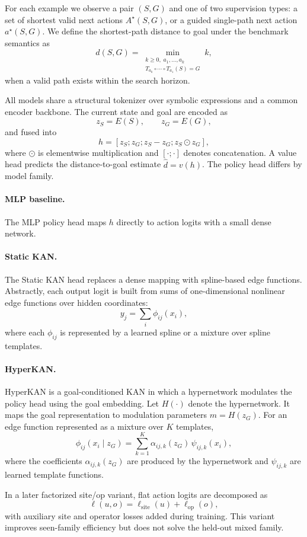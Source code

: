\documentclass[11pt]{article}
\newcommand{\kan}{KAN}
\newcommand{\hyperkan}{HyperKAN}
\newcommand{\staticKAN}{Static KAN}
\newcommand{\mlp}{MLP}
\begin{document}
For each example we observe a pair $(S,G)$ and one of two supervision types: a set of shortest valid next actions $A^\star(S,G)$, or a guided single-path next action $a^\star(S,G)$. We define the shortest-path distance to goal under the benchmark semantics as
\[
d(S,G)=
\min_{\substack{k\ge 0,\; a_1,\ldots,a_k\\
T_{a_k}\circ\cdots\circ T_{a_1}(S)=G}} k,
\]
when a valid path exists within the search horizon.

All models share a structural tokenizer over symbolic expressions and a common encoder backbone. The current state and goal are encoded as
\[
z_S=E(S), \qquad z_G=E(G),
\]
and fused into
\[
h=[z_S;z_G;z_S-z_G;z_S\odot z_G],
\]
where $\odot$ is elementwise multiplication and $[\cdot;\cdot]$ denotes concatenation. A value head predicts the distance-to-goal estimate $\hat d=v(h)$. The policy head differs by model family.

\paragraph{MLP baseline.} The \mlp{} policy head maps $h$ directly to action logits with a small dense network.

\paragraph{Static KAN.} The \staticKAN{} head replaces a dense mapping with spline-based edge functions. Abstractly, each output logit is built from sums of one-dimensional nonlinear edge functions over hidden coordinates:
\[
y_j=\sum_i \phi_{ij}(x_i),
\]
where each $\phi_{ij}$ is represented by a learned spline or a mixture over spline templates.

\paragraph{HyperKAN.} \hyperkan{} is a goal-conditioned \kan{} in which a hypernetwork modulates the policy head using the goal embedding. Let $H(\cdot)$ denote the hypernetwork. It maps the goal representation to modulation parameters $m=H(z_G)$. For an edge function represented as a mixture over $K$ templates,
\[
\phi_{ij}(x_i\mid z_G)=\sum_{k=1}^{K} \alpha_{ij,k}(z_G)\,\psi_{ij,k}(x_i),
\]
where the coefficients $\alpha_{ij,k}(z_G)$ are produced by the hypernetwork and $\psi_{ij,k}$ are learned template functions.

In a later factorized site/op variant, flat action logits are decomposed as
\[
\ell(u,o)=\ell_{\mathrm{site}}(u)+\ell_{\mathrm{op}}(o),
\]
with auxiliary site and operator losses added during training. This variant improves seen-family efficiency but does not solve the held-out mixed family.
\end{document}
